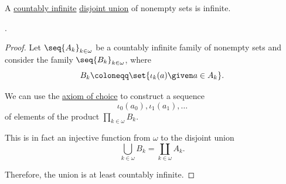 \begin{proposition}\label{thm:countably_infinite_disjoin_union_of_nonempty_sets}
  A \hyperref[def:aleph_zero_related_cardinalities]{countably infinite} \hyperref[def:disjoint_union]{disjoint union} of nonempty sets is infinite.
\end{proposition}
\begin{comments}
  \item {}.
\end{comments}
\begin{proof}
  Let \( \seq{ A_k }_{k \in \omega} \) be a countably infinite family of nonempty sets and consider the family \( \seq{ B_k }_{k \in \omega} \), where
  \begin{equation*}
    B_k \coloneqq \set{ \iota_k(a) \given a \in A_k }.
  \end{equation*}

   We can use the \hyperref[def:zfc/choice]{axiom of choice} to construct a sequence
   \begin{equation*}
     \iota_0(a_0), \iota_1(a_1), \ldots
   \end{equation*}
   of elements of the product \( \prod_{k \in \omega} B_k \).

   This is in fact an injective function from \( \omega \) to the disjoint union
   \begin{equation*}
     \bigcup_{k \in \omega} B_k = \coprod_{k \in \omega} A_k.
   \end{equation*}

   Therefore, the union is at least countably infinite.
\end{proof}

